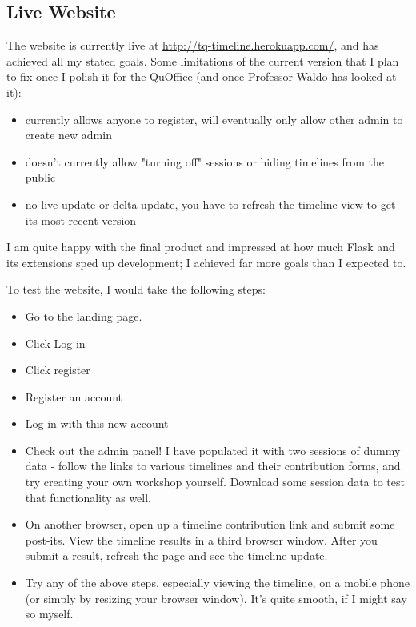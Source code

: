 \documentclass[12pt] {article}
\begin{document}
\subsection{Live Website}

The website is currently live at \href{url}{http://tq-timeline.herokuapp.com/}, and has achieved all my stated goals. Some limitations of the current version that I plan to fix once I polish it for the QuOffice (and once Professor Waldo has looked at it): 
\begin{itemize}
    \item currently allows anyone to register, will eventually only allow other admin to create new admin
    \item doesn't currently allow "turning off" sessions or hiding timelines from the public
    \item no live update or delta update, you have to refresh the timeline view to get its most recent version
\end{itemize}

I am quite happy with the final product and impressed at how much Flask and its extensions sped up development; I achieved far more goals than I expected to. 

To test the website, I would take the following steps: 
\begin{itemize}
    \item Go to the landing page.
    \item Click Log in
    \item Click register
    \item Register an account
    \item Log in with this new account
    \item Check out the admin panel! I have populated it with two sessions of dummy data - follow the links to various timelines and their contribution forms, and try creating your own workshop yourself. Download some session data to test that functionality as well.
    \item On another browser, open up a timeline contribution link and submit some post-its. View the timeline results in a third browser window. After you submit a result, refresh the page and see the timeline update. 
    \item Try any of the above steps, especially viewing the timeline, on a mobile phone (or simply by resizing your browser window). It's quite smooth, if I might say so myself.
\end{itemize}
\end{document}
